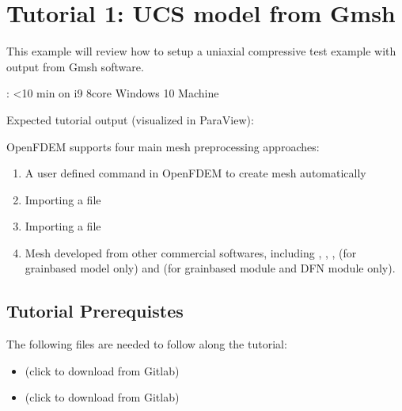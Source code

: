 \documentclass[letterpaper,10pt,english]{sphinxmanual}
\let\sphinxpxdimen\pdfpxdimen\else\newdimen\sphinxpxdimen
\begin{document}
\chapter{Tutorial 1: UCS model from Gmsh}
\label{\detokenize{rst_tutorials/tutorial1_ucs:tutorial-1-ucs-model-from-gmsh}}\label{\detokenize{rst_tutorials/tutorial1_ucs::doc}}
This example will review how to setup a uniaxial compressive test example with output from Gmsh software.

: \textless{}10 min on i9 8\sphinxhyphen{}core Windows 10 Machine

Expected tutorial output (visualized in ParaView):

\noindent{\hspace*{\fill}\sphinxincludegraphics[width=800\sphinxpxdimen]{{ucs_example}.png}\hspace*{\fill}}

OpenFDEM supports four main mesh pre\sphinxhyphen{}processing approaches:
\begin{enumerate}
%
\item {} 
A user defined command in OpenFDEM to create mesh automatically

\item {} 
Importing a  file

\item {} 
Importing a  file

\item {} 
Mesh developed from other commercial softwares, including , , ,  (for grain\sphinxhyphen{}based model only) and  (for grain\sphinxhyphen{}based module and DFN module only).

\end{enumerate}


\section{Tutorial Prerequistes}
\label{\detokenize{rst_tutorials/tutorial1_ucs:tutorial-prerequistes}}
The following files are needed to follow along the tutorial:
\begin{itemize}
\item {} 
 (click to download from Gitlab)

\item {} 
 (click to download from Gitlab)

\end{itemize}
\end{document}
